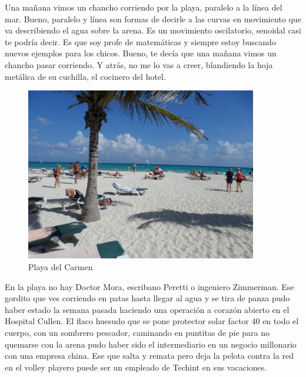 \documentclass[11pt,twoside,openright,a6paper]{book}
\begin{document}
\vspace{0.5cm}
\hrulefill\hspace{0.2cm} \decofourleft\decofourright \hspace{0.2cm} \hrulefill
\vspace{0.5cm}

Una mañana vimos un chancho corriendo por la playa, paralelo a la línea del
mar. Bueno, paralelo y línea son formas de decirle a las curvas en movimiento
que va describiendo el agua sobre la arena. Es un movimiento oscilatorio,
senoidal casi te podría decir. Es que soy profe de matemáticas y siempre
estoy buscando nuevos ejemplos para los chicos. Bueno, te decía que una
mañana vimos un chancho pasar corriendo. Y atrás, no me lo vas a creer,
blandiendo la hoja metálica de su cuchilla, el cocinero del hotel.


\vspace{0.5cm}
\hrulefill\hspace{0.2cm} \decofourleft\decofourright \hspace{0.2cm} \hrulefill
\vspace{0.5cm}

\begin{figure}[H]
  \centering
    \includegraphics[width=0.9\textwidth]{fotos/2012/playaDelCarmen}
  \caption{Playa del Carmen}
  \label{Playa del Carmen}
\end{figure}

En la playa no hay Doctor Mora, escribano Peretti
o ingeniero Zimmerman. Ese gordito que ves corriendo en patas hasta llegar
al agua y se tira de panza pudo haber estado la semana pasada haciendo una
operación a corazón abierto en el Hospital Cullen. El flaco huesudo que se
pone protector solar factor 40 en todo el cuerpo, con un sombrero pescador,
caminando en puntitas de pie para no quemarse con la arena pudo haber sido
el intermediario en un negocio millonario con una empresa china. Ese que
salta y remata pero deja la pelota contra la red en el volley playero puede
ser un empleado de Techint en sus vacaciones.
\end{document}
